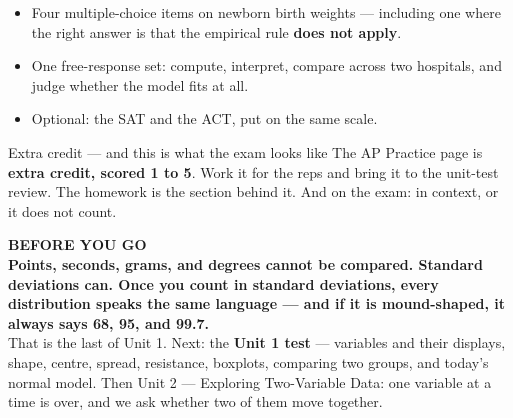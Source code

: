 \documentclass[aspectratio=169, 11pt]{beamer}
\begin{document}
\begin{frame}[t, plain]
  \begin{itemize}\setlength{\itemsep}{5pt}
    \item Four multiple-choice items on newborn birth weights --- including one where the right
          answer is that the empirical rule \textbf{does not apply}.
    \item One free-response set: compute, interpret, compare across two hospitals, and judge
          whether the model fits at all.
    \item Optional: the SAT and the ACT, put on the same scale.
  \end{itemize}
  \begin{block}{Extra credit --- and this is what the exam looks like}
    The AP Practice page is \textbf{extra credit, scored 1 to 5}. Work it for the reps and bring it to the unit-test
    review. The  homework is the section behind it. And on the exam: in context,
    or it does not count.
  \end{block}
\end{frame}

{
\begin{frame}[plain]
  \vspace{1.2cm}\hspace{0.8cm}%
  \begin{minipage}{0.86\textwidth}
    {\color{goldacc}\bfseries\small BEFORE YOU GO}\\[0.6cm]
    {\color{white}\bfseries\Large Points, seconds, grams, and degrees cannot be compared.
    Standard deviations can. Once you count in standard deviations, every distribution speaks the
    same language --- and if it is mound-shaped, it always says 68, 95, and 99.7.}\\[0.8cm]
    {\color{skymid}\small That is the last of Unit 1. Next: the \textbf{Unit 1 test} --- variables
    and their displays, shape, centre, spread, resistance, boxplots, comparing two groups, and
    today's normal model. Then Unit 2 --- Exploring Two-Variable Data: one variable at a time is
    over, and we ask whether two of them move together.}
  \end{minipage}
\end{frame}
}
\end{document}
